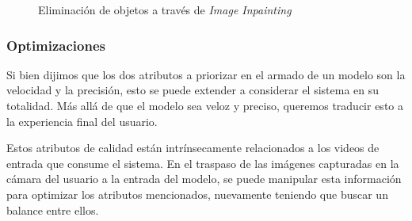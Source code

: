 \documentclass[a4paper]{article}
\begin{document}
\begin{figure}[H]
\caption{Eliminación de objetos a través de \textit{Image Inpainting}}
\end{figure}

\subsubsection{Optimizaciones}

Si bien dijimos que los dos atributos a priorizar en el armado de un modelo son la velocidad y la precisión, esto se puede extender a considerar el sistema en su totalidad. Más allá de que el modelo sea veloz y preciso, queremos traducir esto a la experiencia final del usuario.

Estos atributos de calidad están intrínsecamente relacionados a los videos de entrada que consume el sistema. En el traspaso de las imágenes capturadas en la cámara del usuario a la entrada del modelo, se puede manipular esta información para optimizar los atributos mencionados, nuevamente teniendo que buscar un balance entre ellos. \\
\end{document}
